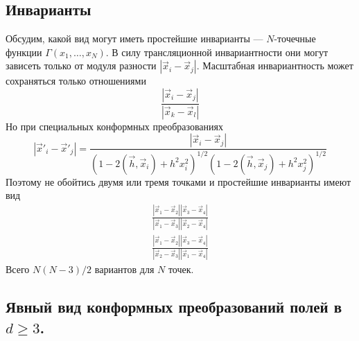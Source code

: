 \documentclass[a4paper,12pt]{article} \usepackage[utf8x]{inputenc} \usepackage[russian]{babel}
\theoremstyle{definition} \newtheorem{corollary}{Corollary}[theorem] \theoremstyle{definition}
\begin{document}
\subsection{Инварианты}
\label{sec:invariants}

Обсудим, какой вид могут иметь простейшие инварианты --- $N$-точечные функции
$\Gamma(x_1,\dots,x_N)$. В силу трансляционной инвариантности они могут зависеть только от модуля
разности $|\vec x_i-\vec x_j|$. Масштабная инвариантность может сохраняться только отношениями
\begin{equation}
  \label{eq:173} \frac{|\vec x_i-\vec x_j|}{|\vec x_k -\vec x_l|}
\end{equation} Но при специальных конформных преобразованиях
\begin{equation}
  \label{eq:174} |\vec x'_i-\vec x'_j|=\frac{|\vec x_i-\vec x_j|}{(1-2(\vec h,\vec
x_i)+h^2x_i^2)^{1/2} (1-2(\vec h,\vec x_j)+h^2 x_j^2)^{1/2}}
\end{equation} Поэтому не обойтись двумя или тремя точками и простейшие инварианты имеют вид
\begin{eqnarray}
  \label{eq:175} \frac{|\vec x_1-\vec x_2||\vec x_3-\vec x_4|}{|\vec x_1-\vec x_3||\vec x_{2}-\vec
x_{4}|}\\ \frac{|\vec x_1-\vec x_2||\vec x_3-\vec x_4|}{|\vec x_2-\vec x_3||\vec x_{1}-\vec x_{4}|}
\end{eqnarray} Всего $N(N-3)/2$ вариантов для $N$ точек.

\subsection{Явный вид конформных преобразований полей в $d\geq 3$.}
\label{sec:conformal-transforms-explicit}
\end{document}
